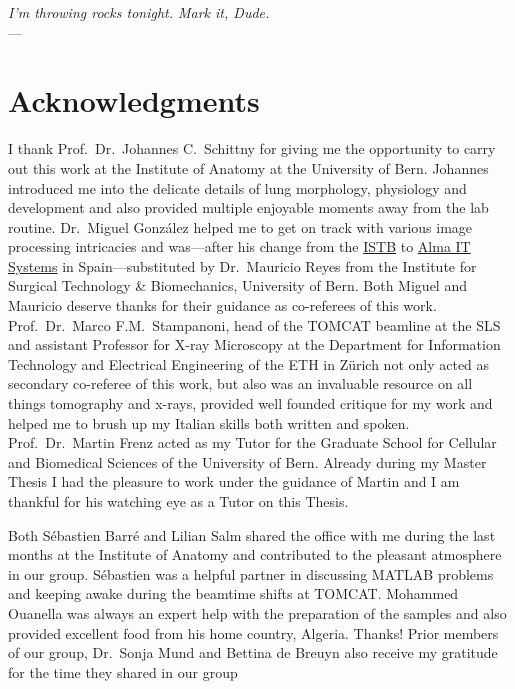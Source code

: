 
\begin{flushright}{\slshape I'm throwing rocks tonight. Mark it, Dude.} \\ \medskip
    ---  \citep{TheBigLebowski}
\end{flushright}

\bigskip
\begingroup
\let\clearpage\relax
\let\cleardoublepage\relax
\let\cleardoublepage\relax
\chapter*{Acknowledgments}
I thank Prof.\ Dr.\ Johannes C.\ Schittny for giving me the opportunity to carry out this work at the Institute of Anatomy at the University of Bern. Johannes introduced me into the delicate details of lung morphology, physiology and development and also provided multiple enjoyable moments away from the lab routine. Dr.\ Miguel González helped me to get on track with various image processing intricacies and was---after his  change from the \href{http://www.istb.unibe.ch/}{ISTB} to \href{http://www.alma3d.com/en}{Alma IT Systems} in Spain---substituted by Dr.\ Mauricio Reyes from the Institute for Surgical Technology \& Biomechanics, University of Bern. Both Miguel and Mauricio deserve thanks for their guidance as co-referees of this work. Prof.\ Dr.\ Marco F.M.\ Stampanoni, head of the \acs{TOMCAT} beamline at the \acl{SLS} and assistant Professor for X-ray Microscopy at the Department for Information Technology and Electrical Engineering of the ETH in Zürich not only acted as secondary co-referee of this work, but also was an invaluable resource on all things tomography and x-rays, provided well founded critique for my work and helped me to brush up my Italian skills both written and spoken. Prof.\ Dr.\ Martin Frenz acted as my Tutor for the Graduate School for Cellular and Biomedical Sciences of the University of Bern. Already during my Master Thesis I had the pleasure to work under the guidance of  Martin and I am thankful for his watching eye as a Tutor on this Thesis.

Both Sébastien Barré and Lilian Salm shared the office with me during the last months at the Institute of Anatomy and contributed to the pleasant atmosphere in our group. Sébastien was a helpful partner in discussing MATLAB problems and keeping awake during the beamtime shifts at \acs{TOMCAT}. Mohammed Ouanella was always an expert help with the preparation of the samples and also provided excellent food from his home country, Algeria. Thanks! Prior members of our group, Dr.\ Sonja Mund and Bettina de Breuyn also receive my gratitude for the time they shared in our group

